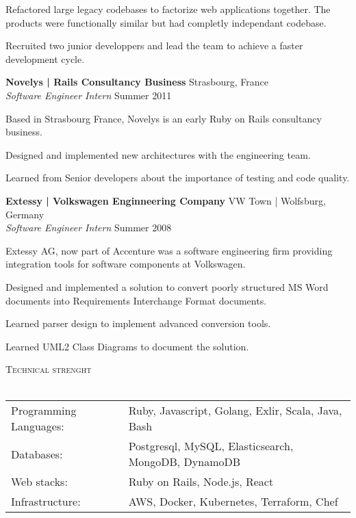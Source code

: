 \documentclass[a4paper]{article}
\newcommand{\lineunder} {
    \vspace*{-8pt} \\
    \hspace*{-18pt} \hrulefill \\
}
\newcommand{\header} [1] {
    {\hspace*{-18pt}\vspace*{6pt} \textsc{#1}}
    \vspace*{-6pt} \lineunder
}
\begin{document}
Refactored large legacy codebases to factorize web applications together.
The products were functionally similar but had completly independant codebase.

Recruited two junior developpers and lead the team to achieve a faster development cycle.

\vspace{2mm}

\textbf{Novelys | Rails Consultancy Business} \hfill Strasbourg, France\\
\textit{Software Engineer Intern} \hfill Summer 2011\\
\vspace{2mm}

\begin{itshape}
Based in Strasbourg France, Novelys is an early Ruby on Rails consultancy business.
\end{itshape}

Designed and implemented new architectures with the engineering team.


Learned from Senior developers about the importance of testing and code quality.


\pagebreak

\textbf{Extessy | Volkswagen Enginneering Company} \hfill VW Town | Wolfsburg, Germany\\
\textit{Software Engineer Intern} \hfill Summer 2008\\
\vspace{2mm}

\begin{itshape}
Extessy AG, now part of Accenture was a software engineering firm providing integration tools for software components at Volkswagen.
\end{itshape}

Designed and implemented a solution to convert poorly structured MS Word documents into Requirements Interchange Format documents.

Learned parser design to implement advanced conversion tools.

Learned UML2 Class Diagrams to document the solution.

\vspace{2mm}

\header{Technical strenght}
\begin{tabular}{ l l }
    Programming Languages:  & Ruby, Javascript, Golang, Exlir, Scala, Java, Bash   \\
    Databases:              & Postgresql, MySQL, Elasticsearch, MongoDB, DynamoDB  \\
    Web stacks:             & Ruby on Rails, Node.js, React                        \\
    Infrastructure:         & AWS, Docker, Kubernetes, Terraform, Chef             \\
\end{tabular}
\end{document}
